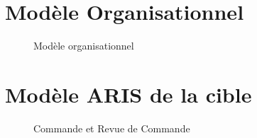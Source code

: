 \chapter{Modèle Organisationnel}

\begin{figure}[H]
    \label{fig-organisationnel}
    \noindent{}
    \caption{Modèle organisationnel}
\end{figure}

\chapter{Modèle ARIS de la cible}

\begin{figure}[H]
    \label{fig-commande-revue}
    \noindent{}
    \caption{Commande et Revue de Commande}
\end{figure}

